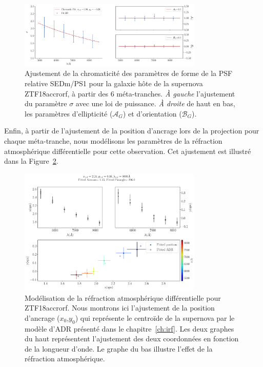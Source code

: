 \documentclass[../main/main.tex]{subfiles}
\begin{document}
\begin{figure}[ht]
  \centering
  \includegraphics[width=0.78\textwidth]{../figures/07_scene/chromaticity_hostZTF18accrorf.pdf}
  \caption[Chromaticité des paramètres de forme de la PSF relative
  SEDm/PS1 pour l'hôte de ZTF18accrorf]{Ajustement de
    la chromaticité
    des paramètres de forme de la PSF relative SEDm/PS1 pour la galaxie
    hôte de la supernova ZTF18accrorf, à
    partir des 6 méta-tranches. \emph{À gauche} l'ajustement du paramètre $\sigma$ avec une
    loi de puissance. \emph{À droite} de haut en bas, les
    paramètres d'ellipticité ($\mathcal{A}_{G}$) et d'orientation ($\mathcal{B}_{G}$).}
  \label{fig:chromaticity_host}
\end{figure}

Enfin, à partir de l'ajustement de la position d'ancrage lors de la
projection pour chaque méta-tranche, nous modélisons les paramètres de la réfraction atmosphérique
différentielle pour cette observation. Cet ajustement est illustré dans
la Figure~\ref{fig:adr_ZTF18accrorf}.

\begin{figure}[ht]
  \centering
  \includegraphics[width=0.78\textwidth]{../figures/07_scene/adr_ZTF18accrorf.pdf}
  \caption[Modélisation de la réfraction atmosphérique
  différentielle pour ZTF18accrorf]{Modélisation de la réfraction atmosphérique
    différentielle pour ZTF18accrorf. Nous montrons ici
    l'ajustement de la position d'ancrage ($x_{0}$,$y_{0}$) qui
    représente le centroïde de la supernova par le modèle
    d'ADR présenté dans le chapitre~\ref{ch:irf}. Les deux graphes du haut représentent l'ajustement des deux
    coordonnées en fonction de la longueur d'onde. Le graphe du bas
    illustre l'effet de la réfraction atmosphérique.}
  \label{fig:adr_ZTF18accrorf}
\end{figure}
\end{document}
